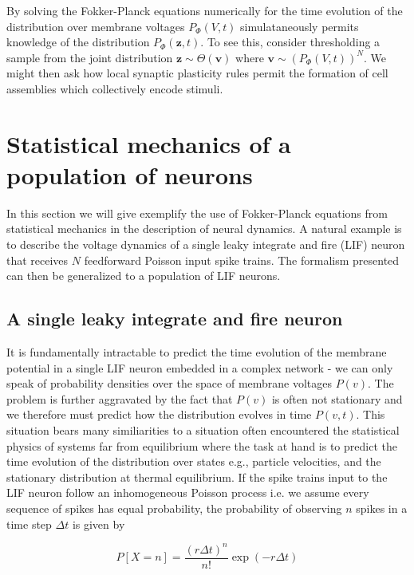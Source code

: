 \documentclass{ucetd}
\begin{document}
By solving the Fokker-Planck equations numerically for the time evolution of the distribution over membrane voltages $P_{\Phi}(V,t)$ simulataneously permits knowledge of the distribution $P_{\Phi}(\mathbf{z},t)$. To see this, consider thresholding a sample from the joint distribution $\mathbf{z} \sim \Theta\left(\mathbf{v}\right)$ where $\mathbf{v} \sim (P_{\Phi}(V,t))^{N}$. We might then ask how local synaptic plasticity rules permit the formation of cell assemblies which collectively encode stimuli.

\chapter{Statistical mechanics of a population of neurons}

In this section we will give exemplify the use of Fokker-Planck equations from statistical mechanics in the description of neural dynamics. A natural example is to describe the voltage dynamics of a single leaky integrate and fire (LIF) neuron that receives $N$ feedforward Poisson input spike trains. The formalism presented can then be generalized to a population of LIF neurons.\\

\section{A single leaky integrate and fire neuron}

It is fundamentally intractable to predict the time evolution of the membrane potential in a single LIF neuron embedded in a complex network - we can only speak of probability densities over the space of membrane voltages $P(v)$. The problem is further aggravated by the fact that $P(v)$ is often not stationary and we therefore must predict how the distribution evolves in time $P(v,t)$. This situation bears many similiarities to a situation often encountered the statistical physics of systems far from equilibrium where the task at hand is to predict the time evolution of the distribution over states e.g., particle velocities, and the stationary distribution at thermal equilibrium. If the spike trains input to the LIF neuron follow an inhomogeneous Poisson process i.e. we assume every sequence of spikes has equal probability, the probability of observing $n$ spikes in a time step $\Delta t$ is given by

\begin{equation*}
P[X=n] = \frac{(r\Delta t)^{n}}{n!}\exp\left(-r\Delta t\right)
\end{equation*}
\end{document}
